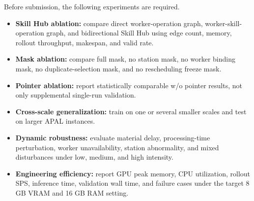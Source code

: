 Before submission, the following experiments are required.
\begin{itemize}
  \item \textbf{Skill Hub ablation:} compare direct worker-operation graph, worker-skill-operation graph, and bidirectional Skill Hub using edge count, memory, rollout throughput, makespan, and valid rate.
  \item \textbf{Mask ablation:} compare full mask, no station mask, no worker binding mask, no duplicate-selection mask, and no rescheduling freeze mask.
  \item \textbf{Pointer ablation:} report statistically comparable w/o pointer results, not only supplemental single-run validation.
  \item \textbf{Cross-scale generalization:} train on one or several smaller scales and test on larger APAL instances.
  \item \textbf{Dynamic robustness:} evaluate material delay, processing-time perturbation, worker unavailability, station abnormality, and mixed disturbances under low, medium, and high intensity.
  \item \textbf{Engineering efficiency:} report GPU peak memory, CPU utilization, rollout SPS, inference time, validation wall time, and failure cases under the target 8 GB VRAM and 16 GB RAM setting.
\end{itemize}
